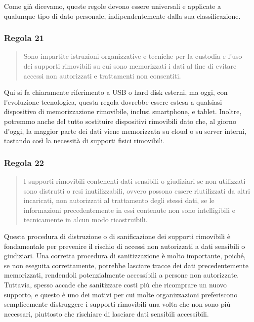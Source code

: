 Come già dicevamo, queste regole devono essere universali e applicate a qualunque tipo di dato personale, indipendentemente dalla sua classificazione.
\subsubsection*{Regola 21}
\begin{quote}
    Sono impartite istruzioni organizzative e tecniche per la custodia e l'uso dei supporti rimovibili su cui sono memorizzati i dati al fine di evitare accessi non autorizzati e trattamenti non consentiti.
\end{quote}

Qui si fa chiaramente riferimento a USB o hard disk esterni, ma oggi, con l'evoluzione tecnologica, questa regola dovrebbe essere estesa a qualsiasi dispositivo di memorizzazione rimovibile, inclusi smartphone, e tablet.
Inoltre, potremmo anche del tutto sostituire dispositivi rimovibili dato che, al giorno d'oggi, la maggior parte dei dati viene memorizzata su cloud o su server interni, tastando così la necessità di supporti fisici rimovibili.
\subsubsection*{Regola 22}
\begin{quote}
    I supporti rimovibili contenenti dati sensibili o giudiziari se non utilizzati sono distrutti o resi inutilizzabili, ovvero possono essere riutilizzati da altri incaricati, non autorizzati al trattamento degli stessi dati, se le informazioni precedentemente in essi contenute non sono intelligibili e tecnicamente in alcun modo ricostruibili.     
\end{quote}
Questa procedura di distruzione o di sanificazione dei supporti rimovibili è fondamentale per prevenire il rischio di accessi non autorizzati a dati sensibili o giudiziari.
Una corretta procedura di sanitizzazione è molto importante, poiché, se non eseguita correttamente, potrebbe lasciare tracce dei dati precedentemente memorizzati, rendendoli potenzialmente accessibili a persone non autorizzate.
Tuttavia, spesso accade che sanitizzare costi più che ricomprare un nuovo supporto, e questo è uno dei motivi per cui molte organizzazioni preferiscono semplicemente distruggere i supporti rimovibili una volta che non sono più necessari, piuttosto che rischiare di lasciare dati sensibili accessibili.
